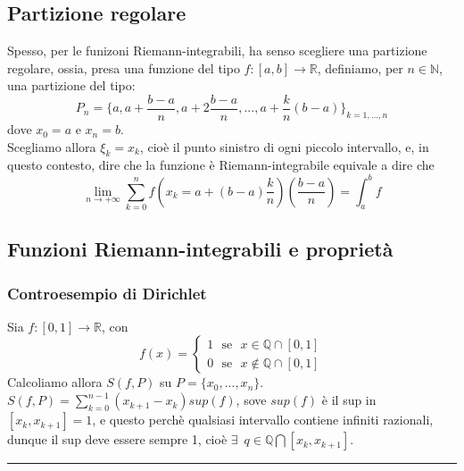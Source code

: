 \documentclass{article}
\theoremstyle{definition}
\newcommand{\R}{\mathbb{R}}
\newcommand{\N}{\mathbb{N}}
\begin{document}
\subsection{Partizione regolare}
Spesso, per le funizoni Riemann-integrabili, ha senso scegliere una partizione regolare, ossia, presa una funzione del tipo $f:[a,b] \to \R$, definiamo, per $n \in \N$, una partizione del tipo:
\begin{equation*}
    P_n=\{a, a+ \frac{b-a}{n}, a+ 2\frac{b-a}{n},...,a+ \frac{k}{n}(b-a)\}_{k=1,...,n}
\end{equation*}
dove $x_0=a$ e $x_n=b$.
\\
Scegliamo allora $\xi_k=x_k$, cioè il punto sinistro di ogni piccolo intervallo, e, in questo contesto, dire che la funzione è Riemann-integrabile equivale a dire che 
\begin{equation*}
    \lim_{n \to +\infty} \sum_{k=0}^n f(x_k= a+(b-a)\frac{k}{n})(\frac{b-a}{n})=\int_a^b f
\end{equation*}
\subsection{Funzioni Riemann-integrabili e proprietà}
\subsubsection{Controesempio di Dirichlet}
Sia $f:[0,1] \to \R$, con 
\begin{equation*}
    f(x)=\begin{cases}
        1 \,\,\,\, \mbox{se} \,\,\,\, x \in \mathbb{Q} \cap [0,1] \\
        0 \,\,\,\, \mbox{se} \,\,\,\, x \notin \mathbb{Q} \cap [0,1]
    \end{cases}
\end{equation*}
Calcoliamo allora $S(f,P)$ su $P=\{x_0,...,x_n\}$.
\\
$S(f,P)=\sum_{k=0}^{n-1}(x_{k+1}-x_k)sup(f)$, sove $sup(f)$ è il sup in $[x_k,x_{k+1}]=1$, e questo perchè qualsiasi intervallo contiene infiniti razionali, dunque il sup deve essere sempre 1, cioè $\exists \,\,\, q \in \mathbb{Q} \bigcap [x_k,x_{k+1}]$.
\\
    \vspace{15pt}
    \hrule
    \vspace{15pt}
\end{document}
